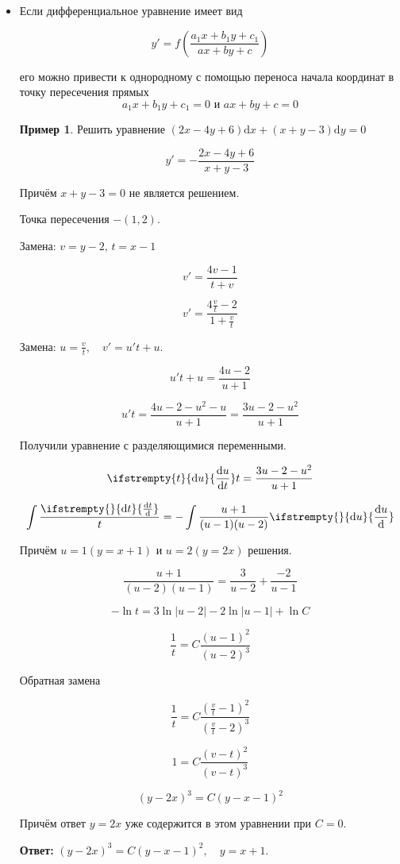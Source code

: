 \documentclass[a4paper, 14pt]{article}
\newcommand{\dx}{\mathrm{d}x}
\newcommand{\dy}{\mathrm{d}y}
\newcommand{\dv}[2]{%
  \ifstrempty{#2}%
    {\mathrm{d}#1}%
    {\frac{\mathrm{d}#1}{\mathrm{d}#2}}%
}
\theoremstyle{definition}
\newtheorem*{example}{Пример}
\newenvironment{answer}
  {\par\noindent\textbf{Ответ:}}
  {\par}
\begin{document}
\begin{itemize}
\item \textbf{}Если дифференциальное уравнение имеет вид

\[y' = f\left(\frac{a_1x+b_1y+c_1}{ax+by+c}\right)\]

его можно привести к однородному с помощью переноса начала координат в точку пересечения прямых
\[a_1x+b_1y+c_1 = 0 \text{ и } ax+by+c = 0\]

\begin{example}
    Решить уравнение $(2x-4y+6)\dx + (x+y-3)\dy = 0$

    \[y'=- \frac{2x-4y+6}{x+y-3}\]

    Причём $x+y-3 = 0$ не является решением.

    Точка пересечения $- (1, 2)$.
    
    Замена: $v = y-2, \, t = x-1$

    \[v'=\frac{4v-1}{t+v}\]

    \[v'=\frac{4\frac{v}{t}-2}{1+\frac{v}{t}}\]

    Замена: $u = \frac{v}{t}, \quad v' = u't+u$.

    \[u't+u = \frac{4u-2}{u+1}\]

    \[u't =\frac{4u-2-u^2-u}{u+1} = \frac{3u-2-u^2}{u+1}\]

    Получили уравнение с разделяющимися переменными.

    \[\dv{u}{t}t = \frac{3u-2-u^2}{u+1}\]

    \[\int\frac{\dv{t}{}}{t} = -\int\frac{u+1}{(u-1)(u-2)}\dv{u}{}\]

    Причём $u = 1(y =x+1)$ и $u=2(y=2x)$ решения.

    \[\frac{u+1}{(u-2)(u-1)} = \frac{3}{u-2} + \frac{-2}{u-1}\]

    \[-\ln{t}= 3\ln{|u-2|} - 2\ln{|u-1|} + \ln{C} \]

    \[\frac{1}{t} = C\frac{(u-1)^2}{(u-2)^3}\]

    Обратная замена

    \[\frac{1}{t} = C\frac{(\frac{v}{t}-1)^2}{(\frac{v}{t}-2)^3}\]

    \[1 = C\frac{(v-t)^2}{(v-t)^3}\]

    \[(y-2x)^3 = C(y-x-1)^2\]

    Причём ответ $y = 2x$ уже содержится в этом уравнении при $C=0.$
    
\end{example}
\begin{answer}
    $(y-2x)^3 = C(y-x-1)^2, \quad y =x +1.$
\end{answer}



\end{itemize}
\end{document}

